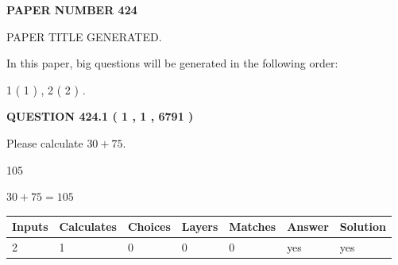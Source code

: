 \documentclass[12pt]{article}
\begin{document}
   
 {\textbf{ \Large{ PAPER NUMBER  424  }}}
   
   
\vspace{0.2in}
   
   
   
   
   
   
   
   
 \vspace{0.2in}
 
 
 
 
   
   
 PAPER TITLE GENERATED.
   
   
   
\vspace{0.2in}
   
In this paper, big questions will be generated in the following order: 
   
   
   1 ( 1 )
 ,
   2 ( 2 )
 .
  
\vspace{0.2in}
  
{\textbf{\Large{QUESTION
424.1 
 ( 1 , 1 , 6791 )
}}}
  
  
 
Please calculate $ %
30 +  %
75 $.
 
 
 
\noindent{}
 
 

105
 
 
\noindent{}
 
 

 
 
 
\noindent{}
 
 

$ %
30 +  %
75=   %
105$
 
 
\noindent{}
 
 

 
   
   
   
   
\noindent\begin{tabular}{|l|l|l|l|l|l|l|}
 \hline
Inputs & Calculates & Choices & Layers & Matches & Answer & Solution \\ \hline
 2  & 
 1  & 
 0
  & 
 0  & 
 0  & 
  yes & 
  yes 
  \\ \hline
 \end{tabular}
   
\end{document}
